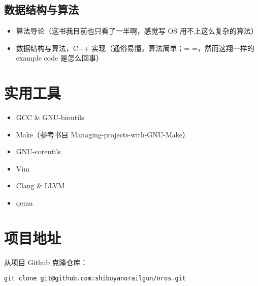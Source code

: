 \subsection{数据结构与算法}
\begin{itemize}
	\item 算法导论（这书我目前也只看了一半啊，感觉写 OS 用不上这么复杂的算法）
	\item 数据结构与算法，C++ 实现（通俗易懂，算法简单；= =，然而这翔一样的 example code 是怎么回事）
\end{itemize}

\section{实用工具}

\begin{itemize}
	\item GCC \& GNU-binutils
	\item Make（参考书目 Managing-projects-with-GNU-Make）
	\item GNU-coreutils
	\item Vim
	\item Clang \& LLVM
	\item qemu
\end{itemize}

\section{项目地址}
从项目 Github 克隆仓库：
\begin{lstlisting}[frame=single]
git clone git@github.com:shibuyanorailgun/nros.git
\end{lstlisting}

